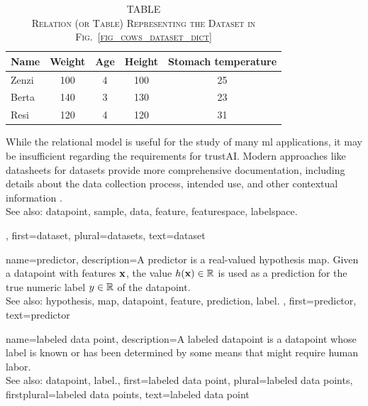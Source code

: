 {{		\begin{table}[H]
			\caption*{
				\centering 
				\scshape TABLE \thetable \\[0.5ex]
				\scshape Relation (or Table) Representing the Dataset in Fig.\ \ref{fig_cows_dataset_dict} 
			}
			\label{tab:cowdata_dict} 
			\centering
			\begin{tabular}{lcccc}
				\hline
				\textbf{Name} & \textbf{Weight} & \textbf{Age} & \textbf{Height} & \textbf{Stomach temperature} \\
				\hline
				Zenzi & 100 & 4 & 100 & 25 \\
				Berta & 140 & 3 & 130 & 23 \\
				Resi  & 120 & 4 & 120 & 31 \\
				\hline
			\end{tabular}
		\end{table}
 		While the \gls{relational model} is useful for the study of many \gls{ml} applications, 
		it may be insufficient regarding the requirements for \gls{trustAI}. Modern 
 		approaches like datasheets for datasets provide more comprehensive 
 		documentation, including details about the \gls{data} collection process, intended 
 		use, and other contextual information \cite{DatasheetData2021}.
 		\\
		See also: \gls{datapoint}, \gls{sample}, \gls{data}, \gls{feature}, \gls{featurespace}, \gls{labelspace}.},
	first={dataset},
	plural={datasets},
	text={dataset}  
}

{name={predictor},
	description={A predictor is a real-valued \gls{hypothesis} \gls{map}. 
		Given a \gls{datapoint} with \glspl{feature} ${\bf x}$, the value 
		$h({\bf x}) \in \mathbb{R}$ is used as a \gls{prediction} for the true 
		numeric \gls{label} $y \in \mathbb{R}$ of the \gls{datapoint}.
				\\
		See also: \gls{hypothesis}, \gls{map}, \gls{datapoint}, \gls{feature}, \gls{prediction}, \gls{label}. },
	first={predictor},
	text={predictor}  
}

{name={labeled data point},
 	description={A labeled \gls{datapoint} is a \gls{datapoint} whose \gls{label} is known 
		or has been determined by some means that might require human labor.
			\\
		See also: \gls{datapoint}, \gls{label}.},
 	first={labeled data point},
	plural={labeled data points},
	firstplural={labeled data points},
 	text={labeled data point}  
}
 
